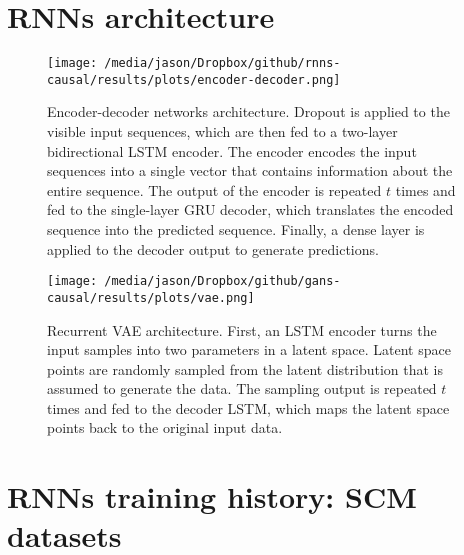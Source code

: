 \documentclass[12pt]{article}
\begin{document}
\begin{singlespacing}
\maketitle \thispagestyle{empty}
\tableofcontents \thispagestyle{empty}
\end{singlespacing}


\pagebreak
{}%

\section{RNNs architecture} 

\begin{figure}[htb]
	\begin{center}
		\texttt{[image: /media/jason/Dropbox/github/rnns-causal/results/plots/encoder-decoder.png]} \\
		\caption{Encoder-decoder networks architecture. Dropout is applied to the visible input sequences, which are then fed to a two-layer bidirectional LSTM encoder. The encoder encodes the input sequences into a single vector that contains information about the entire sequence. The output of the encoder is repeated $t$ times and fed to the single-layer GRU decoder, which translates the encoded sequence into the predicted sequence. Finally, a dense layer is applied to the decoder output to generate predictions. \label{encoder-decoder}} 
	\end{center}
\end{figure}

\begin{figure}[htbp]
	\begin{center}
		\texttt{[image: /media/jason/Dropbox/github/gans-causal/results/plots/vae.png]} \\
		\caption{Recurrent VAE architecture. First, an LSTM encoder turns the input samples into two parameters in a latent space. Latent space points are randomly sampled from the latent distribution that is assumed to generate the data. The sampling output is repeated $t$ times and fed to the decoder LSTM, which maps the latent space points back to the original input data.  \label{vae}} 
	\end{center}
\end{figure}

\section{RNNs training history: SCM datasets}
\end{document}
